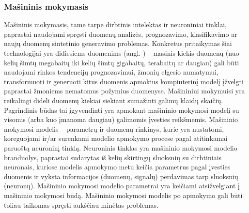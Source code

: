 \documentclass{VUMIFInfBakalaurinis}
\begin{document}
\subsubsection{Mašininis mokymasis}
Mašininis mokymasis, tame tarpe dirbtinis intelektas ir neuroniniai tinklai, 
paprastai naudojami spręsti duomenų analizės, prognozavimo, klasifikavimo ar 
naujų duomenų sintetinio generavimo problemas. Konkretus pritaikymas šiai 
technologijai yra didiesiems duomenims (angl. ) -- masinis 
kiekis duomenų (nuo kelių šimtų megabaitų iki kelių šimtų gigabaitų, terabaitų 
ar daugiau) gali būti naudojami rinkos tendencijų prognozavimui, žmonių elgesio 
numatymui, transformuoti ir generuoti kitus duomenis apmokius kompiuterinį 
modelį įžvelgti paprastai žmoniems nematomus požymius duomenyse. Mašininiui 
mokymuisi yra reikalingi dideli duomenų kiekiai siekiant sumažinti galimų klaidų 
skaičių. Pagrindinis būdas tai įgyvendinti yra apmokant mašininio mokymosi 
modelį su visomis (arba kuo įmanoma daugiau) galimomis įvesties reikšmėmis. 
Mašininio mokymosi modelis -- parametrų ir duomenų rinkinys, kurie yra 
nustatomi, koreguojami ir/ar surenkami modelio apmokymo procese pagal 
atitinkamai paruoštą neuroninį tinklą. Neuroninis tinklas yra mašininio mokymosi 
modelio branduolys, paprastai sudarytas iš kelių skirtingų sluoksnių su 
dirbtiniais neuronais, kuriose modelis apmokymo metu keičia parametrus pagal 
įvesties duomenis ir vyksta informacijos (duomenų, signalų) perdavimas tarp 
sluoksnių (neuronų). Mašininio mokymosi modelio parametrai yra keičiami 
atsižvelgiant į mašininio mokymosi būdą. Mašininio mokymosi modelis po apmokymo 
gali būti toliau taikomas spręsti aukščiau minėtas problemas.
\end{document}
